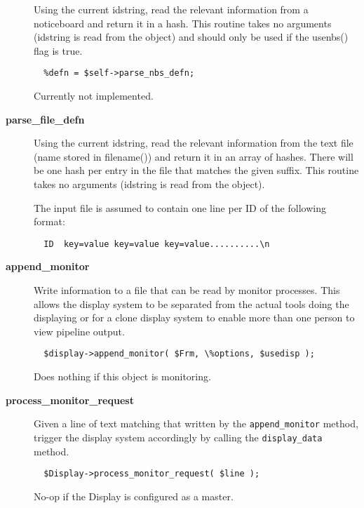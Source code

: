 \begin{description}
Using the current idstring, read the relevant information from
a noticeboard and return it in a hash. This routine takes no
arguments (idstring is read from the object) and should only
be used if the usenbs() flag is true.

\begin{verbatim}
  %defn = $self->parse_nbs_defn;
\end{verbatim}


Currently not implemented.


\item[{\textbf{parse\_file\_defn}}] \mbox{}

Using the current idstring, read the relevant information from
the text file (name stored in filename()) and return it in an array
of  hashes. There will be one hash per entry in the file that
matches the given suffix.
This routine takes no arguments (idstring is read from the object).



The input file is assumed to contain one line per ID of the following
format:

\begin{verbatim}
  ID  key=value key=value key=value..........\n
\end{verbatim}

\item[{\textbf{append\_monitor}}] \mbox{}

Write information to a file that can be read by monitor processes. This allows the
display system to be separated from the actual tools doing the displaying or for
a clone display system to enable more than one person to view pipeline output.

\begin{verbatim}
  $display->append_monitor( $Frm, \%options, $usedisp );
\end{verbatim}


Does nothing if this object is monitoring.


\item[{\textbf{process\_monitor\_request}}] \mbox{}

Given a line of text matching that written by the \texttt{append\_monitor} method,
trigger the display system accordingly by calling the \texttt{display\_data} method.

\begin{verbatim}
  $Display->process_monitor_request( $line );
\end{verbatim}


No-op if the Display is configured as a master.

\end{description}
